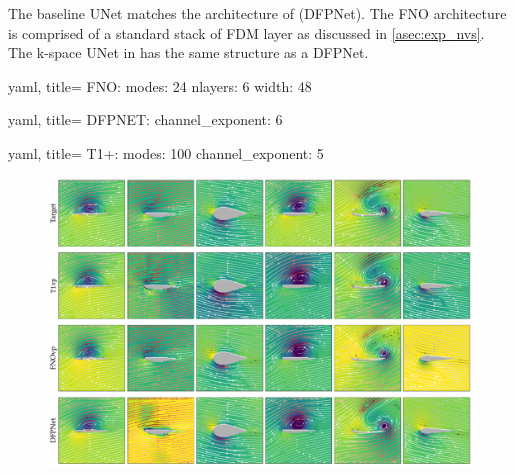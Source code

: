 The baseline UNet matches the architecture of \citep{thuerey2020deep} (DFPNet). The FNO architecture is comprised of a standard stack of FDM layer as discussed in \ref{asec:exp_nvs}. The k-space UNet in \ourmethod{+} has the same structure as a DFPNet.

\begin{listing}[H]
\begin{minipage}[t]{0.32\textwidth}
\begin{mintedbox}{yaml, title=}
FNO:
modes: 24 
nlayers: 6
width: 48  \end{mintedbox}
\end{minipage}
%
\begin{minipage}[t]{0.32\textwidth}
\begin{mintedbox}{yaml, title=}
DFPNET:
channel_exponent: 6 \end{mintedbox}
\end{minipage}
%
\begin{minipage}[t]{0.32\textwidth}
\begin{mintedbox}{yaml, title=\config{\ourmethod{+}}}
T1+: 
modes: 100 
channel_exponent: 5 \end{mintedbox}
\end{minipage}
\vspace{-6mm}
\end{listing}

\begin{figure}[h!]
    \centering
    \includegraphics[width=\linewidth]{figures/dfp_predictions_big.pdf}
    \vspace{-4mm}
\label{fig:dfp-predictions-big}
\end{figure}

